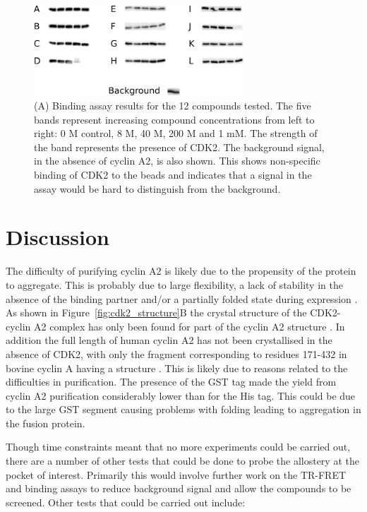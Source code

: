 \begin{figure}
\centering

\includegraphics[width=0.7\textwidth]{figures/binding_assay/binding_assay}

\caption[Results of binding assay with selected compounds]
{(A) Binding assay results for the 12 compounds tested.
The five bands represent increasing compound concentrations from left to right: 0 M control, 8 \textmu M, 40 \textmu M, 200 \textmu M and 1 mM.
The strength of the band represents the presence of CDK2.
The background signal, in the absence of cyclin A2, is also shown.
This shows non-specific binding of CDK2 to the beads and indicates that a signal in the assay would be hard to distinguish from the background.}

\label{fig:binding_assay}
\end{figure}


\section{Discussion}
\label{sec:cdk2_discussion}

The difficulty of purifying cyclin A2 is likely due to the propensity of the protein to aggregate.
This is probably due to large flexibility, a lack of stability in the absence of the binding partner and/or a partially folded state during expression \cite{Grigoroudis2015}.
As shown in Figure~\ref{fig:cdk2_structure}B the crystal structure of the CDK2-cyclin A2 complex has only been found for part of the cyclin A2 structure \cite{Jeffrey1995}.
In addition the full length of human cyclin A2 has not been crystallised in the absence of CDK2, with only the fragment corresponding to residues 171-432 in bovine cyclin A having a structure \cite{Brown1995}.
This is likely due to reasons related to the difficulties in purification.
The presence of the GST tag made the yield from cyclin A2 purification considerably lower than for the His tag.
This could be due to the large GST segment causing problems with folding leading to aggregation in the fusion protein.

Though time constraints meant that no more experiments could be carried out, there are a number of other tests that could be done to probe the allostery at the pocket of interest.
Primarily this would involve further work on the TR-FRET and binding assays to reduce background signal and allow the compounds to be screened.
Other tests that could be carried out include:

